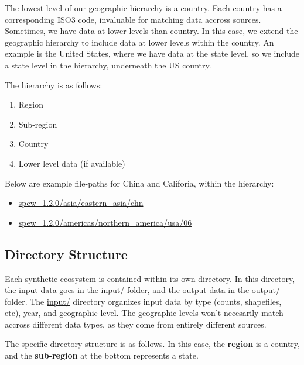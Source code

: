 \documentclass{article}
\begin{document}
The lowest level of our geographic hierarchy is a country. Each country has a corresponding ISO3 code, invaluable for matching data accross sources. Sometimes, we have data at lower levels than country. In this case, we extend the geographic hierarchy to include data at lower levels within the country. An example is the United States, where we have data at the state level, so we include a state level in the hierarchy, underneath the US country.

The hierarchy is as follows:

\begin{enumerate}
	\item Region
	\item Sub-region 
	\item Country
	\item Lower level data (if available)
\end{enumerate}

Below are example file-paths for China and Califoria, within the hierarchy:

\begin{itemize}
	\item \url{spew_1.2.0/asia/eastern_asia/chn}
	\item \url{spew_1.2.0/americas/northern_america/usa/06}
\end{itemize}

\subsection{Directory Structure}
Each synthetic ecosystem is contained within its own directory. In this directory, the input data goes in the \url{input/} folder, and the output data in the \url{output/} folder. The \url{input/} directory organizes input data by type (counts, shapefiles, etc), year, and geographic level. The geographic levels won't necesarily match accross different data types, as they come from entirely different sources. 

The specific directory structure is as follows. In this case, the \textbf{region} is a country, and the \textbf{sub-region} at the bottom represents a state. 

\newpage
{}
\end{document}
